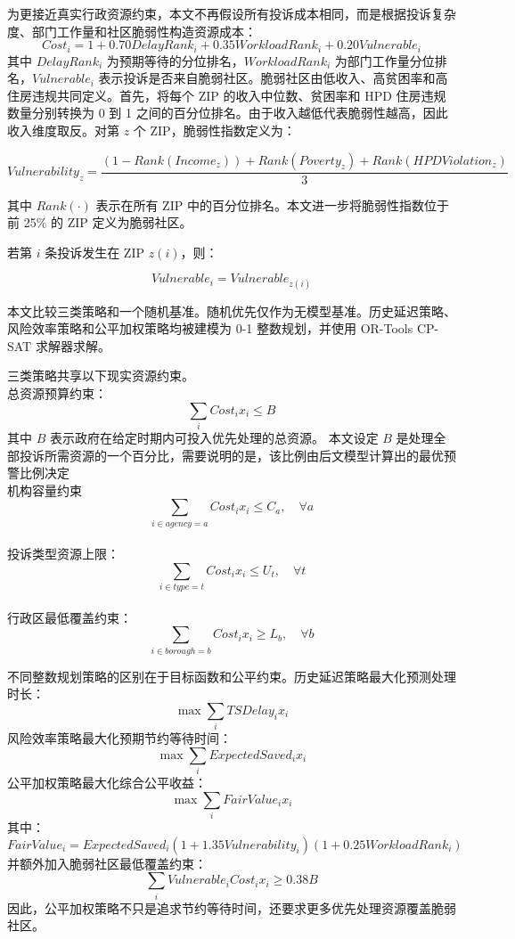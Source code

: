 \documentclass[UTF8,a4paper,12pt]{ctexart}
\begin{document}
为更接近真实行政资源约束，本文不再假设所有投诉成本相同，而是根据投诉复杂度、部门工作量和社区脆弱性构造资源成本：
\[
Cost_i=1+0.70DelayRank_i+0.35WorkloadRank_i+0.20Vulnerable_i
\]
其中 \(DelayRank_i\) 为预期等待的分位排名，\(WorkloadRank_i\) 为部门工作量分位排名，\(Vulnerable_i\) 表示投诉是否来自脆弱社区。脆弱社区由低收入、高贫困率和高住房违规共同定义。首先，将每个 ZIP 的收入中位数、贫困率和 HPD 住房违规数量分别转换为 0 到 1 之间的百分位排名。由于收入越低代表脆弱性越高，因此收入维度取反。对第 \(z\) 个 ZIP，脆弱性指数定义为：

\begin{equation}
Vulnerability_z
=
\frac{
(1-Rank(Income_z))
+
Rank(Poverty_z)
+
Rank(HPDViolation_z)
}{3}
\end{equation}

其中 \(Rank(\cdot)\) 表示在所有 ZIP 中的百分位排名。本文进一步将脆弱性指数位于前 25\% 的 ZIP 定义为脆弱社区。

若第 \(i\) 条投诉发生在 ZIP \(z(i)\)，则：

\begin{equation}
Vulnerable_i = Vulnerable_{z(i)}
\end{equation}

本文比较三类策略和一个随机基准。随机优先仅作为无模型基准。历史延迟策略、风险效率策略和公平加权策略均被建模为 0-1 整数规划，并使用 OR-Tools CP-SAT 求解器求解。

三类策略共享以下现实资源约束。\\总资源预算约束：
\[
\sum_i Cost_i x_i\leq B
\]
其中 \(B\) 表示政府在给定时期内可投入优先处理的总资源。
本文设定 \(B\) 是处理全部投诉所需资源的一个百分比，需要说明的是，该比例由后文模型计算出的最优预警比例决定 
\\机构容量约束
\[
\sum_{i\in agency=a}Cost_i x_i\leq C_a,\quad \forall a
\]
\\投诉类型资源上限：
\[
\sum_{i\in type=t}Cost_i x_i\leq U_t,\quad \forall t
\]
\\行政区最低覆盖约束：
\[
\sum_{i\in borough=b}Cost_i x_i\geq L_b,\quad \forall b
\]

不同整数规划策略的区别在于目标函数和公平约束。历史延迟策略最大化预测处理时长：
\[
\max \sum_i TSDelay_i x_i
\]
风险效率策略最大化预期节约等待时间：
\[
\max \sum_i ExpectedSaved_i x_i
\]
公平加权策略最大化综合公平收益：
\[
\max \sum_i FairValue_i x_i
\]
其中：
\[
FairValue_i=ExpectedSaved_i(1+1.35Vulnerability_i)(1+0.25WorkloadRank_i)
\]
并额外加入脆弱社区最低覆盖约束：
\[
\sum_i Vulnerable_iCost_i x_i\geq0.38B
\]
因此，公平加权策略不只是追求节约等待时间，还要求更多优先处理资源覆盖脆弱社区。
\end{document}
